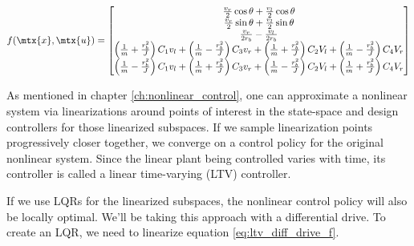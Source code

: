 \begin{equation}
  f(\mtx{x}, \mtx{u}) =
  \begin{bmatrix}
    \frac{v_r}{2}\cos\theta + \frac{v_l}{2}\cos\theta \\
    \frac{v_r}{2}\sin\theta + \frac{v_l}{2}\sin\theta \\
    \frac{v_r}{2r_b} - \frac{v_l}{2r_b} \\
    \left(\frac{1}{m} + \frac{r_b^2}{J}\right) C_1 v_l +
      \left(\frac{1}{m} - \frac{r_b^2}{J}\right) C_3 v_r +
      \left(\frac{1}{m} + \frac{r_b^2}{J}\right) C_2 V_l +
      \left(\frac{1}{m} - \frac{r_b^2}{J}\right) C_4 V_r \\
    \left(\frac{1}{m} - \frac{r_b^2}{J}\right) C_1 v_l +
      \left(\frac{1}{m} + \frac{r_b^2}{J}\right) C_3 v_r +
      \left(\frac{1}{m} - \frac{r_b^2}{J}\right) C_2 V_l +
      \left(\frac{1}{m} + \frac{r_b^2}{J}\right) C_4 V_r
  \end{bmatrix}
  \label{eq:ltv_diff_drive_f}
\end{equation}

As mentioned in chapter \ref{ch:nonlinear_control}, one can approximate a
nonlinear system via linearizations around points of interest in the state-space
and design controllers for those linearized subspaces. If we sample
linearization points progressively closer together, we converge on a control
policy for the original nonlinear system. Since the linear \gls{plant} being
controlled varies with time, its controller is called a linear time-varying
(LTV) controller.

If we use LQRs for the linearized subspaces, the nonlinear control policy will
also be locally optimal. We'll be taking this approach with a differential
drive. To create an LQR, we need to linearize equation
\eqref{eq:ltv_diff_drive_f}.

